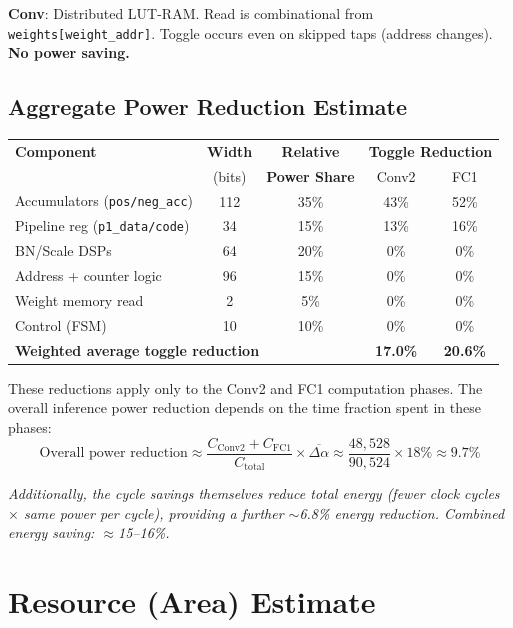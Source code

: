 \documentclass[11pt,a4paper]{article}
\begin{document}
\noindent\textbf{Conv}: Distributed LUT-RAM.  Read is combinational from
\texttt{weights[weight\_addr]}.  Toggle occurs even on skipped taps (address
changes).  \textbf{No power saving.}

\subsection{Aggregate Power Reduction Estimate}

\begin{center}
\begin{tabular}{lcccc}
\toprule
\textbf{Component} & \textbf{Width} & \textbf{Relative}
& \multicolumn{2}{c}{\textbf{Toggle Reduction}} \\
& (bits) & \textbf{Power Share} & Conv2 & FC1 \\
\midrule
Accumulators (\texttt{pos/neg\_acc}) & 112 & 35\% & 43\% & 52\% \\
Pipeline reg (\texttt{p1\_data/code}) & 34 & 15\% & 13\% & 16\% \\
BN/Scale DSPs & 64 & 20\% & 0\% & 0\% \\
Address + counter logic & 96 & 15\% & 0\% & 0\% \\
Weight memory read & 2 & 5\% & 0\% & 0\% \\
Control (FSM) & 10 & 10\% & 0\% & 0\% \\
\midrule
\multicolumn{3}{l}{\textbf{Weighted average toggle reduction}}
& \textbf{17.0\%} & \textbf{20.6\%} \\
\bottomrule
\end{tabular}
\end{center}

These reductions apply only to the Conv2 and FC1 computation phases.  The
overall inference power reduction depends on the time fraction spent in these
phases:
\begin{equation}
\text{Overall power reduction} \approx
\frac{C_{\text{Conv2}} + C_{\text{FC1}}}{C_{\text{total}}}
\times \overline{\Delta\alpha}
\approx \frac{48{,}528}{90{,}524} \times 18\%
\approx \boxed{9.7\%}
\end{equation}

\noindent\textit{Additionally, the cycle savings themselves reduce total energy
(fewer clock cycles $\times$ same power per cycle), providing a further
$\sim$6.8\% energy reduction.  Combined energy saving: $\approx$15--16\%.}

\section{Resource (Area) Estimate}
\label{sec:area}
\end{document}
